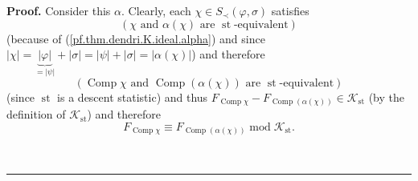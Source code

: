 \documentclass[numbers=enddot,12pt,final,onecolumn,notitlepage]{scrartcl}%
\theoremstyle{definition}
\newenvironment{proof}[1][Proof]{\noindent\textbf{#1.} }{\ \rule{0.5em}{0.5em}}
\begin{document}
\begin{proof}
Consider this $\alpha$. Clearly, each $\chi\in S_{\prec}\left(  \varphi
,\sigma\right)  $ satisfies%
\[
\left(  \chi\text{ and }\alpha\left(  \chi\right)  \text{ are }%
\operatorname*{st}\text{-equivalent}\right)
\]
(because of (\ref{pf.thm.dendri.K.ideal.alpha}) and since $\left\vert
\chi\right\vert =\underbrace{\left\vert \varphi\right\vert }_{=\left\vert
\psi\right\vert }+\left\vert \sigma\right\vert =\left\vert \psi\right\vert
+\left\vert \sigma\right\vert =\left\vert \alpha\left(  \chi\right)
\right\vert $) and therefore%
\[
\left(  \operatorname*{Comp}\chi\text{ and }\operatorname*{Comp}\left(
\alpha\left(  \chi\right)  \right)  \text{ are }\operatorname*{st}%
\text{-equivalent}\right)
\]
(since $\operatorname*{st}$ is a descent statistic) and thus
$F_{\operatorname*{Comp}\chi}-F_{\operatorname*{Comp}\left(  \alpha\left(
\chi\right)  \right)  }\in\mathcal{K}_{\operatorname*{st}}$ (by the definition
of $\mathcal{K}_{\operatorname*{st}}$) and therefore%
\begin{equation}
F_{\operatorname*{Comp}\chi}\equiv F_{\operatorname*{Comp}\left(
\alpha\left(  \chi\right)  \right)  }\operatorname{mod}\mathcal{K}%
_{\operatorname*{st}}. \label{pf.thm.dendri.K.ideal.alphaeq}%
\end{equation}



\end{proof}
\end{document}
